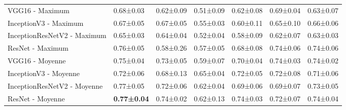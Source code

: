 \begin{landscape}
\begin{table}[]
\begin{tabular}{lllllll}
VGG16    - Maximum            & 0.68±0.03          & 0.62±0.09          & 0.51±0.09         & 0.62±0.08         & 0.69±0.04             & 0.63±0.07 \\
InceptionV3  - Maximum        & 0.67±0.05          & 0.67±0.05          & 0.55±0.03         & 0.60±0.11         & 0.65±0.10             & 0.66±0.06 \\
InceptionResNetV2  - Maximum  & 0.65±0.03          & 0.64±0.04          & 0.52±0.04         & 0.58±0.09         & 0.62±0.07             & 0.63±0.03 \\
ResNet - Maximum              & 0.76±0.05          & 0.58±0.26          & 0.57±0.05         & 0.68±0.08         & 0.74±0.06             & 0.74±0.06 \\
VGG16 - Moyenne               & 0.75±0.04          & 0.73±0.05          & 0.59±0.07         & 0.70±0.04         & 0.74±0.03             & 0.74±0.02 \\
InceptionV3 - Moyenne         & 0.72±0.06          & 0.68±0.13          & 0.65±0.04         & 0.72±0.05         & 0.72±0.08             & 0.71±0.06 \\
InceptionResNetV2 - Moyenne   & 0.77±0.05          & 0.72±0.06          & 0.62±0.04         & 0.69±0.06         & 0.69±0.07             & 0.73±0.05 \\
\rowcolor[HTML]{E7E6E6} 
ResNet - Moyenne              & \textbf{0.77±0.04} & 0.74±0.02          & 0.62±0.13         & 0.74±0.03         & 0.72±0.07             & 0.74±0.04
\end{tabular}
\label{tab:image_classification_mm}
\end{table}
\end{landscape}



